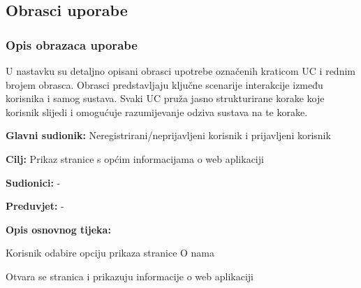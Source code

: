 			\subsection{Obrasci uporabe}
				
				\subsubsection{Opis obrazaca uporabe}
				
				\noindent U nastavku su detaljno opisani obrasci upotrebe označenih kraticom UC i rednim brojem obrasca. Obrasci predstavljaju ključne scenarije interakcije između korisnika i samog sustava. Svaki UC pruža jasno strukturirane korake koje korisnik slijedi i omogućuje razumijevanje odziva sustava na te korake.  \\
				
					\noindent {}
					\begin{packed_item}
						
						\item \textbf{Glavni sudionik:} Neregistrirani/neprijavljeni korisnik i prijavljeni korisnik
						\item  \textbf{Cilj:} Prikaz stranice s općim informacijama o web aplikaciji
						\item  \textbf{Sudionici:} -
						\item  \textbf{Preduvjet:} -
						\item  \textbf{Opis osnovnog tijeka:}
						
						\item[] \begin{packed_enum}
							
							\item Korisnik odabire opciju prikaza stranice O nama
							\item Otvara se stranica i prikazuju informacije o web aplikaciji
							
						\end{packed_enum}						
					\end{packed_item}
					
					

